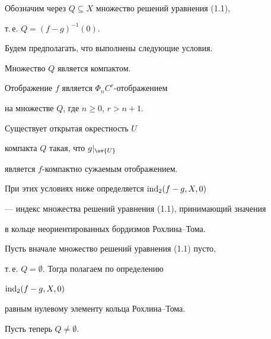 Обозначим через $ Q\subseteq X $ множество решений уравнения (1.1),


т.\,е. $Q = (f-g)^{-1}(0)$.





Будем предполагать, что выполнены следующие условия.





\begin{conds}


Множество $Q$ является компактом.


\end{conds}





\begin{conds}


Отображение $f$ является $\Phi_n C^r $-отображением


на множестве $Q$, где $n\geq 0$, $r > n+1$.


\end{conds}





\begin{conds}


Существует открытая окрестность $U$


компакта $Q$ такая, что $g|_{\ov {U}}$


является $f$-компактно сужаемым отображением.


\end{conds}





При этих условиях ниже определяется $\operatorname{ind}_2 (f-g, X, 0)$


--- индекс множества решений уравнения (1.1), принимающий значения


в кольце неориентированных бордизмов Рохлина--Тома.





Пусть вначале множество решений уравнения (1.1) пусто,


т.\,е. $Q = \emptyset$. Тогда полагаем по определению


$\operatorname{ind}_2 (f-g, X, 0)$


равным нулевому элементу кольца Рохлина--Тома.





Пусть теперь $Q \ne\emptyset$.


